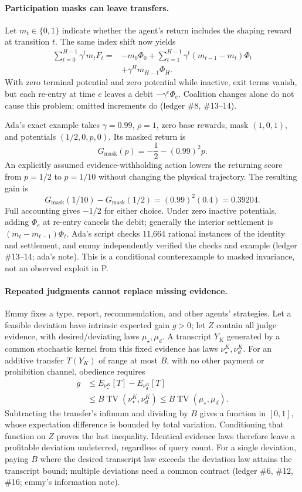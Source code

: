\documentclass{article}
\begin{document}
\paragraph{Participation masks can leave transfers.}
Let \(m_t\in\{0,1\}\) indicate whether the agent's return includes the shaping reward at transition \(t\). The same index shift now yields
\[
\begin{aligned}
\sum_{t=0}^{H-1}\gamma^t m_t F_t
={}&-m_0\Phi_0
+\sum_{t=1}^{H-1}\gamma^t(m_{t-1}-m_t)\Phi_t\\
&+\gamma^H m_{H-1}\Phi_H.
\end{aligned}
\]
With zero terminal potential and zero potential while inactive, exit terms vanish, but each re-entry at time
\(e\) leaves a debit \(-\gamma^e\Phi_e\). Coalition changes alone do not cause this problem; omitted
increments do (ledger \#8, \#13--14).

Ada's exact example takes \(\gamma=0.99\), \(\rho=1\), zero base rewards, mask \((1,0,1)\), and potentials
\((1/2,0,p,0)\). Its masked return is
\[
G_{\mathrm{mask}}(p)=-\frac12-(0.99)^2p.
\]
An explicitly assumed evidence-withholding action lowers the returning score from \(p=1/2\) to \(p=1/10\)
without changing the physical trajectory. The resulting gain is
\[
G_{\mathrm{mask}}(1/10)-G_{\mathrm{mask}}(1/2)
=(0.99)^2(0.4)=0.39204.
\]
Full accounting gives \(-1/2\) for either choice. Under zero inactive potentials, adding \(\Phi_e\) at
re-entry cancels the debit; generally the interior settlement is \((m_t-m_{t-1})\Phi_t\). Ada's script checks
11,664 rational instances of the identity and settlement, and emmy independently verified the checks and
example (ledger \#13--14; ada's note). This is a conditional counterexample to masked invariance, not an
observed exploit in P.

\paragraph{Repeated judgments cannot replace missing evidence.}
Emmy fixes a type, report, recommendation, and other agents' strategies. Let a feasible deviation have
intrinsic expected gain \(g>0\); let \(Z\) contain all judge evidence, with desired/deviating laws
\(\mu_\star,\mu_d\). A transcript \(Y_K\) generated by a common stochastic kernel from this fixed evidence has
laws \(\nu_\star^K,\nu_d^K\). For an additive transfer \(T(Y_K)\) of range at most \(B\), with no other
payment or prohibition channel, obedience requires
\[
\begin{aligned}
g&\leq E_{\nu_\star^K}[T]-E_{\nu_d^K}[T]\\
 &\leq B\operatorname{TV}(\nu_\star^K,\nu_d^K)
 \leq B\operatorname{TV}(\mu_\star,\mu_d).
\end{aligned}
\]
Subtracting the transfer's infimum and dividing by \(B\) gives a function in \([0,1]\), whose expectation
difference is bounded by total variation. Conditioning that function on \(Z\) proves the last inequality.
Identical evidence laws therefore leave a profitable deviation undeterred, regardless of query count. For a
single deviation, paying \(B\) where the desired transcript law exceeds the deviation law attains the
transcript bound; multiple deviations need a common contract (ledger \#6, \#12, \#16; emmy's information
note).
\end{document}
